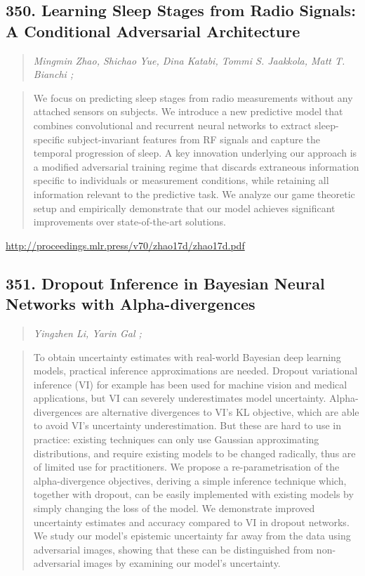 \documentclass{article}
\begin{document}
\subsection{350. Learning Sleep Stages from Radio Signals: A Conditional Adversarial Architecture}

\begin{quote}
\footnotesize{\textit{Mingmin Zhao, Shichao Yue, Dina Katabi, Tommi S. Jaakkola, Matt T. Bianchi ;}}
\end{quote}

\begin{quote}
    We focus on predicting sleep stages from radio measurements without any attached sensors on subjects. We introduce a new predictive model that combines convolutional and recurrent neural networks to extract sleep-specific subject-invariant features from RF signals and capture the temporal progression of sleep. A key innovation underlying our approach is a modified adversarial training regime that discards extraneous information specific to individuals or measurement conditions, while retaining all information relevant to the predictive task. We analyze our game theoretic setup and empirically demonstrate that our model achieves significant improvements over state-of-the-art solutions.  \end{quote}

\href{http://proceedings.mlr.press/v70/zhao17d/zhao17d.pdf}{http://proceedings.mlr.press/v70/zhao17d/zhao17d.pdf}

\subsection{351. Dropout Inference in Bayesian Neural Networks with Alpha-divergences}

\begin{quote}
\footnotesize{\textit{Yingzhen Li, Yarin Gal ;}}
\end{quote}

\begin{quote}
    To obtain uncertainty estimates with real-world Bayesian deep learning models, practical inference approximations are needed. Dropout variational inference (VI) for example has been used for machine vision and medical applications, but VI can severely underestimates model uncertainty. Alpha-divergences are alternative divergences to VI’s KL objective, which are able to avoid VI’s uncertainty underestimation. But these are hard to use in practice: existing techniques can only use Gaussian approximating distributions, and require existing models to be changed radically, thus are of limited use for practitioners. We propose a re-parametrisation of the alpha-divergence objectives, deriving a simple inference technique which, together with dropout, can be easily implemented with existing models by simply changing the loss of the model. We demonstrate improved uncertainty estimates and accuracy compared to VI in dropout networks. We study our model’s epistemic uncertainty far away from the data using adversarial images, showing that these can be distinguished from non-adversarial images by examining our model’s uncertainty.  \end{quote}
\end{document}

